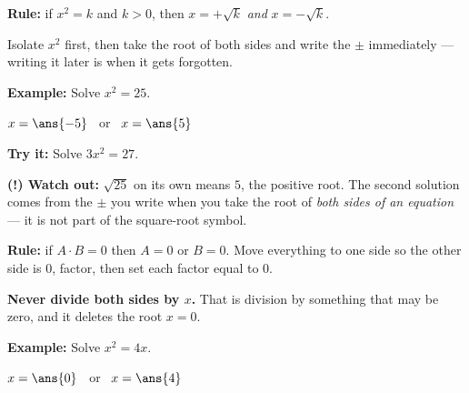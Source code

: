 \documentclass[12pt]{article}
\begin{document}


\begin{formulabox}
\textbf{Rule:} \quad if $x^2 = k$ and $k > 0$, then $x = +\sqrt{k}$ \emph{and} $x = -\sqrt{k}$.\par\smallskip
Isolate $x^2$ first, then take the root of both sides and write the $\pm$ immediately --- writing it later is when it gets forgotten.
\end{formulabox}

\begin{examplebox}
\textbf{Example:} \quad Solve $x^2 = 25$.
\par
$x = \ans{-5}$ \ or \ $x = \ans{5}$
\end{examplebox}

\begin{tryitbox}
\textbf{Try it:} \quad Solve $3x^2 = 27$.\\[2pt]
\end{tryitbox}

\begin{watchoutbox}
\textbf{(!) Watch out:} $\sqrt{25}$ on its own means $5$, the positive root. The second solution comes from the $\pm$ you write when you take the root of \emph{both sides of an equation} --- it is not part of the square-root symbol.
\end{watchoutbox}


\begin{formulabox}
\textbf{Rule:} \quad if $A \cdot B = 0$ then $A = 0$ or $B = 0$. Move everything to one side so the other side is $0$, factor, then set each factor equal to $0$.\par\smallskip
\textbf{Never divide both sides by $x$.} That is division by something that may be zero, and it deletes the root $x = 0$.
\end{formulabox}

\begin{examplebox}
\textbf{Example:} \quad Solve $x^2 = 4x$.
\par
$x = \ans{0}$ \ or \ $x = \ans{4}$
\end{examplebox}
\end{document}
